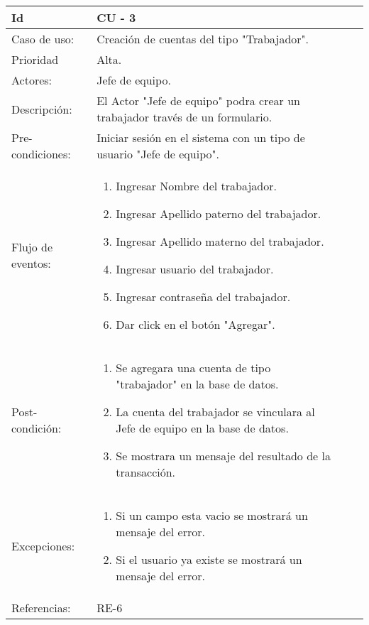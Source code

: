 \documentclass[11pt,a4paper]{article}
\begin{document}
\begin{tabular}[c]{|p{3cm}|p{13cm}|p{2.5cm}|p{3cm}|}
\hline 
\rule[-1ex]{0pt}{2.5ex} Id & CU - 3 \\ 
\hline 
\rule[-1ex]{0pt}{2.5ex} Caso de uso: & Creación de cuentas del tipo "Trabajador". \\ 
\hline 
\rule[-1ex]{0pt}{2.5ex} Prioridad & Alta. \\ 
\hline 
\rule[-1ex]{0pt}{2.5ex} Actores: & Jefe de equipo. \\ 
\hline 
\rule[-1ex]{0pt}{2.5ex} Descripción: & El Actor "Jefe de equipo" podra crear un trabajador través de un formulario. \\ 
\hline 
\rule[-1ex]{0pt}{2.5ex} Pre-condiciones: & Iniciar sesión en el sistema con un tipo de usuario "Jefe de equipo". \\ 
\hline 
\rule[-1ex]{0pt}{2.5ex} Flujo de eventos: & \begin{enumerate}
\item Ingresar Nombre del trabajador.
\item Ingresar Apellido paterno del trabajador.
\item Ingresar Apellido materno del trabajador.
\item Ingresar usuario del trabajador.
\item Ingresar contraseña del trabajador.
\item Dar click en el botón "Agregar".
\end{enumerate} \\ 
\hline 
\rule[-1ex]{0pt}{2.5ex} Post-condición: & \begin{enumerate}
\item Se agregara una cuenta de tipo "trabajador" en la base de datos.
\item La cuenta del trabajador se vinculara al Jefe de equipo en la base de datos.
\item Se mostrara un mensaje del resultado de la transacción.
\end{enumerate} \\ 
\hline 
\rule[-1ex]{0pt}{2.5ex} Excepciones: & \begin{enumerate}
\item Si un campo esta vacio se mostrará un mensaje del error.
\item Si el usuario ya existe se mostrará un mensaje del error.
\end{enumerate} \\ 
\hline 
\rule[-1ex]{0pt}{2.5ex} Referencias: & RE-6\\ 
\hline 
\end{tabular} 
\\
\end{document}
